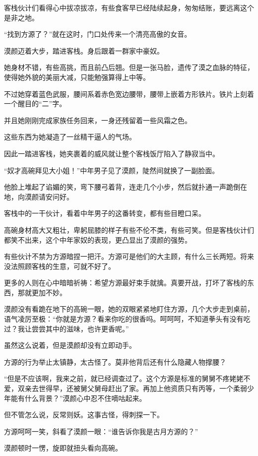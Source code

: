 \begin{this_body}
客栈伙计们看得心中拔凉拔凉，有些食客早已经陆续起身，匆匆结账，要远离这个是非之地。

“找到方源了？”就在这时，门口处传来一个清亮高傲的女音。

漠颜迈着大步，踏进客栈。身后跟着一群家中豪奴。

她身材不错，有些高挑，而且前凸后翘。但是一张马脸，遗传了漠之血脉的特征，使得她外貌的美丽大减，只能勉强算得上中等。

不过她穿着蓝色武服，腰间系着赤色宽边腰带，腰带上嵌着方形铁片。铁片上刻着一个醒目的“二”字。

并且她刚刚完成家族任务回来，一身还残留着一些风霜之色。

这些东西为她凝造了一丝精干逼人的气场。

因此一踏进客栈，她夹裹着的威风就让整个客栈饭厅陷入了静寂当中。

“奴才高碗拜见大小姐！”中年男子见了漠颜，陡然间就换了一副脸面。

他脸上堆起了谄媚的笑，弯下腰弓着背，连走几个小步，然后就扑通一声跪倒在地，向漠颜请安问好。

客栈中的一干伙计，看着中年男子的这番转变，都有些目瞪口呆。

高碗身材高大又粗壮，卑躬屈膝的样子有些不伦不类，有些可笑。但是客栈伙计们都笑不出来，这个中年家奴的表现，更凸显出了漠颜的强势。

有些伙计不禁为方源暗捏一把汗。方源可是他们的大主顾，有什么三长两短。将来没法照顾客栈的生意，可就不好了。

更多的人则在心中暗暗祈祷：希望方源最好束手就擒。真要开战，打坏了客栈的东西，那就更加不妙。

漠颜没有看跪在地下的高碗一眼，她的双眼紧紧地盯住方源，几个大步走到桌前，语气凌厉至极：“你就是方源？看来你吃的很香吗。呵呵呵，不知道拳头有没有吃过？我让尝尝其中的滋味，也许更香呢。”

虽然这么说着，但是漠颜却没有立即动手。

方源的行为举止太镇静，太古怪了。莫非他背后还有什么隐藏人物撑腰？

“但是不应该啊，我来之前，就已经调查过了。这个方源是标准的舅舅不疼姥姥不爱，双亲去世得早，还被舅父舅母赶出了家。再加上他资质只有丙等，一个柔弱少年能有什么背景？”漠颜心中忍不住嘀咕起来。

但不管怎么说，反常则妖。这事古怪，得刺探一下。

方源呵呵一笑，斜看了漠颜一眼：“谁告诉你我是古月方源的？”

漠颜顿时一愣，旋即就扭头看向高碗。


\end{this_body}

